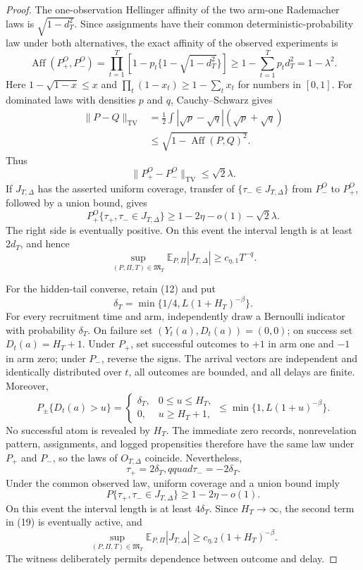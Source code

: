 \documentclass{article}
\begin{document}
\begin{proof}
The one-observation Hellinger affinity of the two arm-one Rademacher laws is \(\sqrt{1-d_T^2}\).  Since assignments have their common deterministic-probability law under both alternatives, the exact affinity of the observed experiments is
\[
 \operatorname{Aff}(P_+^O,P_-^O)
 =\prod_{t=1}^T\left[1-p_t\{1-\sqrt{1-d_T^2}\}\right]
 \geq1-\sum_{t=1}^Tp_td_T^2=1-\lambda^2. \tag{14}
\]
Here \(1-\sqrt{1-x}\leq x\) and \(\prod_t(1-x_t)\geq1-\sum_tx_t\) for numbers in \([0,1]\).  For dominated laws with densities \(p\) and \(q\), Cauchy--Schwarz gives
\[
 \begin{aligned}
 \|P-Q\|_{\mathrm{TV}}
 &=\frac12\int|\sqrt p-\sqrt q|(\sqrt p+\sqrt q)\\
 &\leq\sqrt{1-\operatorname{Aff}(P,Q)^2}.
 \end{aligned} \tag{15}
\]
Thus
\[
 \|P_+^O-P_-^O\|_{\mathrm{TV}}\leq\sqrt2\lambda. \tag{16}
\]
If \(J_{T,\Delta}\) has the asserted uniform coverage, transfer of \(\{\tau_-\in J_{T,\Delta}\}\) from \(P_-^O\) to \(P_+^O\), followed by a union bound, gives
\[
 P_+^O\{\tau_+,\tau_-\in J_{T,\Delta}\}
 \geq1-2\eta-o(1)-\sqrt2\lambda. \tag{17}
\]
The right side is eventually positive.  On this event the interval length is at least \(2d_T\), and hence
\[
 \sup_{(P,\Pi,T)\in\mathfrak M_T}
 \mathbb E_{P,\Pi}|J_{T,\Delta}|\geq c_{\eta,1}T^{-q}. \tag{18}
\]

For the hidden-tail converse, retain (12) and put
\[
 \delta_T=\min\{1/4,L(1+H_T)^{-\beta}\}. \tag{19}
\]
For every recruitment time and arm, independently draw a Bernoulli indicator with probability \(\delta_T\).  On failure set \((Y_t(a),D_t(a))=(0,0)\); on success set \(D_t(a)=H_T+1\).  Under \(P_+\), set successful outcomes to \(+1\) in arm one and \(-1\) in arm zero; under \(P_-\), reverse the signs.  The arrival vectors are independent and identically distributed over \(t\), all outcomes are bounded, and all delays are finite.  Moreover,
\[
 P_\pm\{D_t(a)>u\}=
 \begin{cases}
 \delta_T,&0\leq u\leq H_T,\\
 0,&u\geq H_T+1,
 \end{cases}
 \leq\min\{1,L(1+u)^{-\beta}\}. \tag{20}
\]
No successful atom is revealed by \(H_T\).  The immediate zero records, nonrevelation pattern, assignments, and logged propensities therefore have the same law under \(P_+\) and \(P_-\), so the laws of \(O_{T,\Delta}\) coincide.  Nevertheless,
\[
 \tau_+=2\delta_T,qquad \tau_-=-2\delta_T. \tag{21}
\]
Under the common observed law, uniform coverage and a union bound imply
\[
 P\{\tau_+,\tau_-\in J_{T,\Delta}\}\geq1-2\eta-o(1). \tag{22}
\]
On this event the interval length is at least \(4\delta_T\).  Since \(H_T\to\infty\), the second term in (19) is eventually active, and
\[
 \sup_{(P,\Pi,T)\in\mathfrak M_T}
 \mathbb E_{P,\Pi}|J_{T,\Delta}|\geq c_{\eta,2}(1+H_T)^{-\beta}. \tag{23}
\]
The witness deliberately permits dependence between outcome and delay.


\end{proof}
\end{document}
